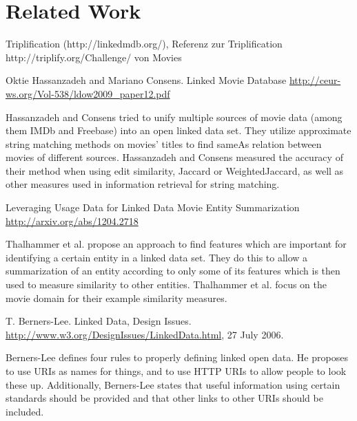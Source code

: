 \section{Related Work}
\label{sec_related_work}


Triplification (http://linkedmdb.org/), Referenz zur Triplification http://triplify.org/Challenge/ von Movies

Oktie Hassanzadeh and Mariano Consens. Linked Movie Database
\url{http://ceur-ws.org/Vol-538/ldow2009_paper12.pdf}

Hassanzadeh and Consens tried to unify multiple sources of movie data (among them IMDb and Freebase) into an open linked data set.
They utilize approximate string matching methods on movies' titles to find sameAs relation between movies of different sources.
Hassanzadeh and Consens measured the accuracy of their method when using edit similarity, Jaccard or WeightedJaccard, as well as other measures used in information retrieval for string matching.

Leveraging Usage Data for Linked Data Movie Entity Summarization 
\url{http://arxiv.org/abs/1204.2718}

Thalhammer et al. propose an approach to find features which are important for identifying a certain entity in a linked data set.
They do this to allow a summarization of an entity according to only some of its features which is then used to measure similarity to other entities.
Thalhammer et al. focus on the movie domain for their example similarity measures.

T. Berners-Lee. Linked Data, Design Issues.
\url{http://www.w3.org/DesignIssues/LinkedData.html}, 27 July 2006.

Berners-Lee defines four rules to properly defining linked open data.
He proposes to use URIs as names for things, and to use HTTP URIs to allow people to look these up.
Additionally, Berners-Lee states that useful information using certain standards should be provided and that other links to other URIs should be included.
